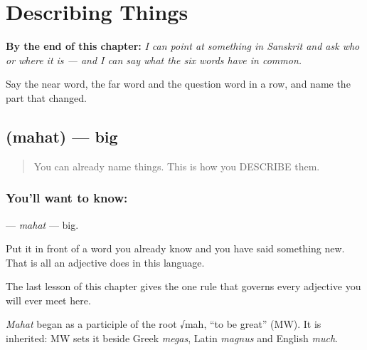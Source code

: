 
\chapter{Describing Things}
\label{ch:sa-describing-things}

\begin{chapteropening}
\textbf{By the end of this chapter:} \emph{I can point at something in Sanskrit and ask who or where it is — and I can say what the six words have in common.}

Say the near word, the far word and the question word in a row, and name the part that changed.
\end{chapteropening}

\section[\texorpdfstring{\sk{महत्} (mahat)}{महत् (mahat)}]{ (mahat) — big}

\label{lesson:SA-C15-big}



\begin{quote}
You can already name things. This is how you DESCRIBE them.
\end{quote}

\subsection*{You'll want to know: }
\textbf{} — \emph{mahat} — big.

Put it in front of a word you already know and you have said something new. That is all an adjective does in this language.

The last lesson of this chapter gives the one rule that governs every adjective you will ever meet here.

\begin{cousinweb}
\emph{Mahat} began as a participle of the root √mah, \textquotedblleft{}to be great\textquotedblright{} (MW). It is inherited: MW sets it beside Greek \emph{megas}, Latin \emph{magnus} and English \emph{much}.
\end{cousinweb}

